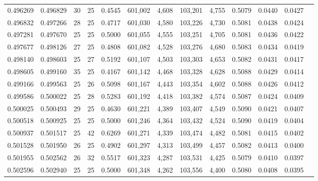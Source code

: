 \begin{tabular}{rrrrrrrrrrrrr}
0.496269 & 0.496829 &    30 &  25 &                                     0.4545 & 601,002 &   4,608 & 103,201 &   4,755 & 0.5079 & 0.0440 & 0.0427 \\
0.496832 & 0.497266 &    28 &  25 &                                     0.4717 & 601,030 &   4,580 & 103,226 &   4,730 & 0.5081 & 0.0438 & 0.0424 \\
0.497281 & 0.497670 &    25 &  25 &                                     0.5000 & 601,055 &   4,555 & 103,251 &   4,705 & 0.5081 & 0.0436 & 0.0422 \\
0.497677 & 0.498126 &    27 &  25 &                                     0.4808 & 601,082 &   4,528 & 103,276 &   4,680 & 0.5083 & 0.0434 & 0.0419 \\
0.498140 & 0.498603 &    25 &  27 &                                     0.5192 & 601,107 &   4,503 & 103,303 &   4,653 & 0.5082 & 0.0431 & 0.0417 \\
0.498605 & 0.499160 &    35 &  25 &                                     0.4167 & 601,142 &   4,468 & 103,328 &   4,628 & 0.5088 & 0.0429 & 0.0414 \\
0.499166 & 0.499563 &    25 &  26 &                                     0.5098 & 601,167 &   4,443 & 103,354 &   4,602 & 0.5088 & 0.0426 & 0.0412 \\
0.499586 & 0.500022 &    25 &  28 &                                     0.5283 & 601,192 &   4,418 & 103,382 &   4,574 & 0.5087 & 0.0424 & 0.0409 \\
0.500025 & 0.500493 &    29 &  25 &                                     0.4630 & 601,221 &   4,389 & 103,407 &   4,549 & 0.5090 & 0.0421 & 0.0407 \\
0.500518 & 0.500925 &    25 &  25 &                                     0.5000 & 601,246 &   4,364 & 103,432 &   4,524 & 0.5090 & 0.0419 & 0.0404 \\
0.500937 & 0.501517 &    25 &  42 &                                     0.6269 & 601,271 &   4,339 & 103,474 &   4,482 & 0.5081 & 0.0415 & 0.0402 \\
0.501528 & 0.501950 &    26 &  25 &                                     0.4902 & 601,297 &   4,313 & 103,499 &   4,457 & 0.5082 & 0.0413 & 0.0400 \\
0.501955 & 0.502562 &    26 &  32 &                                     0.5517 & 601,323 &   4,287 & 103,531 &   4,425 & 0.5079 & 0.0410 & 0.0397 \\
0.502596 & 0.502940 &    25 &  25 &                                     0.5000 & 601,348 &   4,262 & 103,556 &   4,400 & 0.5080 & 0.0408 & 0.0395 \\

\end{tabular}
